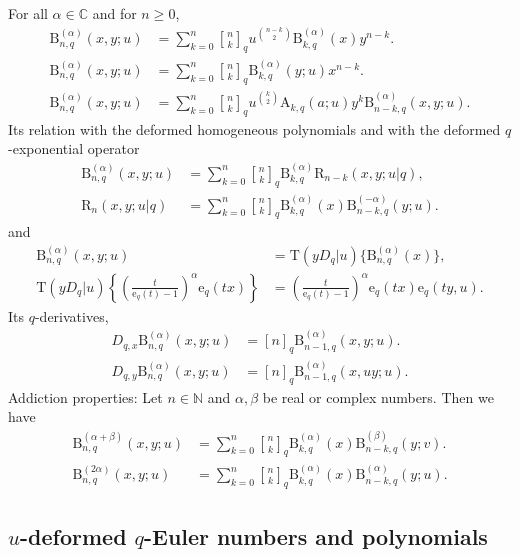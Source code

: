 \documentclass[12pt]{article}
\newcommand{\qbinom}{\genfrac{[}{]}{0pt}{}}
\newcommand{\C}{\mathbb{C}}
\newcommand{\N}{\mathbb{N}}
\newcommand{\e}{\mathrm{e}}
\newcommand{\AAA}{\mathrm{A}}
\newcommand{\B}{\mathrm{B}}%
\newcommand{\rr}{\mathrm{R}}
\newcommand{\T}{\mathrm{T}}
\begin{document}
For all $\alpha\in\C$ and for $n\geq0$,
    \begin{align}
        \B_{n,q}^{(\alpha)}(x,y;u)&=\sum_{k=0}^{n}\qbinom{n}{k}_{q}u^{\binom{n-k}{2}}\B_{k,q}^{(\alpha)}(x)y^{n-k}.\\
        \B_{n,q}^{(\alpha)}(x,y;u)&=\sum_{k=0}^{n}\qbinom{n}{k}_{q}\B_{k,q}^{(\alpha)}(y;u)x^{n-k}.\\
        \B_{n,q}^{(\alpha)}(x,y;u)&=\sum_{k=0}^{n}\qbinom{n}{k}_{q}u^{\binom{k}{2}}\AAA_{k,q}(a;u)y^{k}\B_{n-k,q}^{(\alpha)}(x,y;u).
    \end{align}
Its relation with the deformed homogeneous polynomials and with the deformed $q$-exponential operator
\begin{align}
        \B_{n,q}^{(\alpha)}(x,y;u)&=\sum_{k=0}^{n}\qbinom{n}{k}_{q}\B_{k,q}^{(\alpha)}\rr_{n-k}(x,y;u|q),\\
        \rr_{n}(x,y;u|q)&=\sum_{k=0}^{n}\qbinom{n}{k}_{q}\B_{k,q}^{(\alpha)}(x)\B_{n-k,q}^{(-\alpha)}(y;u).
    \end{align}
and
\begin{align}
        \B_{n,q}^{(\alpha)}(x,y;u)&=\T(yD_{q}|u)\{\B_{n,q}^{(\alpha)}(x)\},\\
        \T(yD_{q}|u)\left\{\left(\frac{t}{\e_{q}(t)-1}\right)^{\alpha}\e_{q}(tx)\right\}&=\left(\frac{t}{\e_{q}(t)-1}\right)^{\alpha}\e_{q}(tx)\e_{q}(ty,u).
    \end{align}
Its $q$-derivatives,
\begin{align}
        D_{q,x}\B_{n,q}^{(\alpha)}(x,y;u)&=[n]_{q}\B_{n-1,q}^{(\alpha)}(x,y;u).\\
        D_{q,y}\B_{n,q}^{(\alpha)}(x,y;u)&=[n]_{q}\B_{n-1,q}^{(\alpha)}(x,uy;u).
    \end{align}
Addiction properties:
Let $n\in\N$ and $\alpha,\beta$ be real or complex numbers. Then we have
    \begin{align}
        \B_{n,q}^{(\alpha+\beta)}(x,y;u)&=\sum_{k=0}^{n}\qbinom{n}{k}_{q}\B_{k,q}^{(\alpha)}(x)\B_{n-k,q}^{(\beta)}(y;v).\\
        \B_{n,q}^{(2\alpha)}(x,y;u)&=\sum_{k=0}^{n}\qbinom{n}{k}_{q}\B_{k,q}^{(\alpha)}(x)\B_{n-k,q}^{(\alpha)}(y;u).
    \end{align}


\subsection{$u$-deformed $q$-Euler numbers and polynomials}
\end{document}
